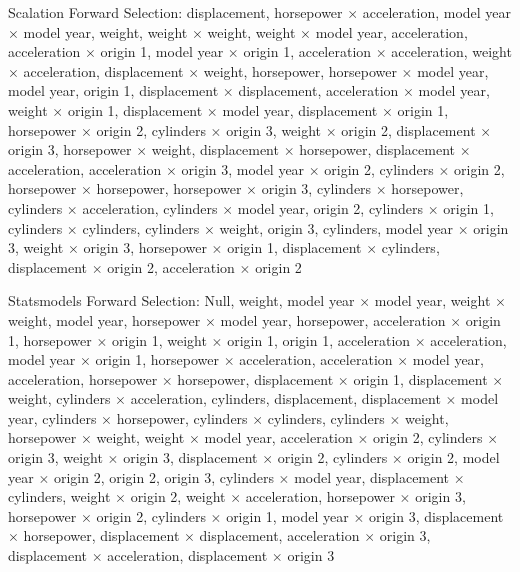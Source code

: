 \documentclass{article}
\begin{document}
Scalation Forward Selection: displacement, horsepower $\times$ acceleration, model year $\times$ model year, weight, weight $\times$ weight, weight $\times$ model year, acceleration, acceleration $\times$ origin 1, model year $\times$ origin 1, acceleration $\times$ acceleration, weight $\times$ acceleration, displacement $\times$ weight, horsepower, horsepower $\times$ model year, model year, origin 1, displacement $\times$ displacement, acceleration $\times$ model year, weight $\times$ origin 1, displacement $\times$ model year, displacement $\times$ origin 1, horsepower $\times$ origin 2, cylinders $\times$ origin 3, weight $\times$ origin 2, displacement $\times$ origin 3, horsepower $\times$ weight, displacement $\times$ horsepower, displacement $\times$ acceleration, acceleration $\times$ origin 3, model year $\times$ origin 2, cylinders $\times$ origin 2, horsepower $\times$ horsepower, horsepower $\times$ origin 3, cylinders $\times$ horsepower, cylinders $\times$ acceleration, cylinders $\times$ model year, origin 2, cylinders $\times$ origin 1, cylinders $\times$ cylinders, cylinders $\times$ weight, origin 3, cylinders, model year $\times$ origin 3, weight $\times$ origin 3, horsepower $\times$ origin 1, displacement $\times$ cylinders, displacement $\times$ origin 2, acceleration $\times$ origin 2

Statsmodels Forward Selection: Null, weight, model year $\times$ model year, weight $\times$ weight, model year, horsepower $\times$ model year, horsepower, acceleration $\times$ origin 1, horsepower $\times$ origin 1, weight $\times$ origin 1, origin 1, acceleration $\times$ acceleration, model year $\times$ origin 1, horsepower $\times$ acceleration, acceleration $\times$ model year, acceleration, horsepower $\times$ horsepower, displacement $\times$ origin 1, displacement $\times$ weight, cylinders $\times$ acceleration, cylinders, displacement, displacement $\times$ model year, cylinders $\times$ horsepower, cylinders $\times$ cylinders, cylinders $\times$ weight, horsepower $\times$ weight, weight $\times$ model year, acceleration $\times$ origin 2, cylinders $\times$ origin 3, weight $\times$ origin 3, displacement $\times$ origin 2, cylinders $\times$ origin 2, model year $\times$ origin 2, origin 2, origin 3, cylinders $\times$ model year, displacement $\times$ cylinders, weight $\times$ origin 2, weight $\times$ acceleration, horsepower $\times$ origin 3, horsepower $\times$ origin 2, cylinders $\times$ origin 1, model year $\times$ origin 3, displacement $\times$ horsepower, displacement $\times$ displacement, acceleration $\times$ origin 3, displacement $\times$ acceleration, displacement $\times$ origin 3
\end{document}
